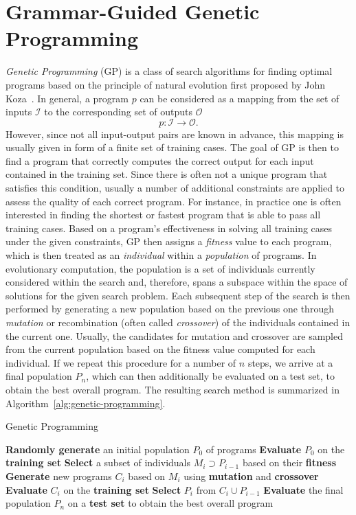 \section{Grammar-Guided Genetic Programming}
\label{sec:gggp}
\emph{Genetic Programming} (GP) is a class of search algorithms for finding optimal programs based on the principle of natural evolution first proposed by John Koza~\cite{koza1994genetic}.
In general, a program $p$ can be considered as a mapping from the set of inputs $\mathcal{I}$ to the corresponding set of outputs $\mathcal{O}$
\begin{equation}
	p : \mathcal{I} \to \mathcal{O}.
	\label{eq:gp-program}
\end{equation}
However, since not all input-output pairs are known in advance, this mapping is usually given in form of a finite set of training cases.
The goal of GP is then to find a program that correctly computes the correct output for each input contained in the training set.
Since there is often not a unique program that satisfies this condition, usually a number of additional constraints are applied to assess the quality of each correct program.
For instance, in practice one is often interested in finding the shortest or fastest program that is able to pass all training cases.
Based on a program's effectiveness in solving all training cases under the given constraints, GP then assigns a \emph{fitness} value to each program, which is then treated as an \emph{individual} within a \emph{population} of programs.
In evolutionary computation, the population is a set of individuals currently considered within the search and, therefore, spans a subspace within the space of solutions for the given search problem.
Each subsequent step of the search is then performed by generating a new population based on the previous one through \emph{mutation} or recombination (often called \emph{crossover}) of the individuals contained in the current one.
Usually, the candidates for mutation and crossover are sampled from the current population based on the fitness value computed for each individual.
If we repeat this procedure for a number of $n$ steps, we arrive at a final population $P_n$, which can then additionally be evaluated on a test set, to obtain the best overall program.
The resulting search method is summarized in Algorithm~\ref{alg:genetic-programming}. 
\begin{algorithm}[t]
	\caption{Genetic Programming}
	\label{alg:genetic-programming}
	\begin{algorithmic}[1] %
		\State \textbf{Randomly generate} an initial population $P_0$ of programs
		\State \textbf{Evaluate} $P_0$ on the \textbf{training set} 
		\State \textbf{Select} a subset of individuals $M_i \supset P_{i-1}$ based on their \textbf{fitness}
		\State \textbf{Generate} new programs $C_i$ based on $M_i$ using \textbf{mutation} and \textbf{crossover}
		\State \textbf{Evaluate} $C_i$ on the \textbf{training set} 
		\State \textbf{Select} $P_{i}$ from $C_i \cup P_{i-1}$
		\EndFor
		\State \textbf{Evaluate} the final population $P_{n}$ on a \textbf{test set}  to obtain the best overall program
	\end{algorithmic}
\end{algorithm}
